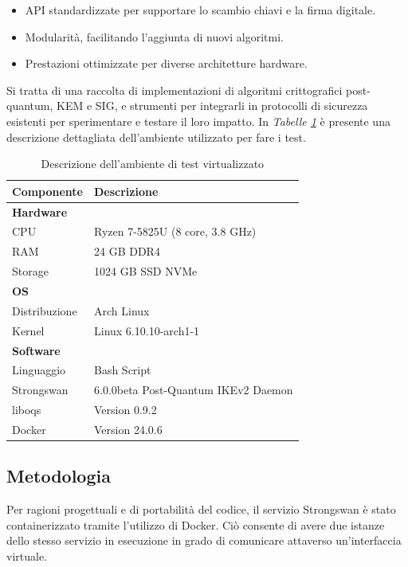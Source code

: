 \begin{itemize}
    \item API standardizzate per supportare lo scambio chiavi e la firma digitale. 
    \item Modularità, facilitando l'aggiunta di nuovi algoritmi. 
    \item Prestazioni ottimizzate per diverse architetture hardware.
\end{itemize}

\noindent
Si tratta di una raccolta di implementazioni di algoritmi crittografici post-quantum, KEM e SIG, e strumenti per integrarli in protocolli di sicurezza esistenti per sperimentare e testare il loro impatto.
In \textit{Tabelle \ref{tab:env}} è presente una descrizione dettagliata dell'ambiente utilizzato per fare i test.

\begin{table}[htbp] 
    \centering 
    \begin{tabular}{p{4cm} p{8cm}} 
        \toprule
        \textbf{Componente} & \textbf{Descrizione} \\ 
        \midrule
        \textbf{Hardware} & \\ 
        CPU & Ryzen 7-5825U (8 core, 3.8 GHz) \\ 
        RAM & 24 GB DDR4 \\ 
        Storage & 1024 GB SSD NVMe \\ 
        \textbf{OS} & \\ 
        Distribuzione & Arch Linux \\
        Kernel & Linux 6.10.10-arch1-1 \\ 
        \textbf{Software} & \\ 
        Linguaggio & Bash Script \\
        Strongswan & 6.0.0beta Post-Quantum IKEv2 Daemon \\
        liboqs & Version 0.9.2 \\
        Docker & Version 24.0.6 \\ 
        \hline 
    \end{tabular} 
    \caption{Descrizione dell'ambiente di test virtualizzato} 
    \label{tab:env}
\end{table}



\subsection{Metodologia}

Per ragioni progettuali e di portabilità del codice, il servizio Strongswan è stato 
containerizzato tramite l'utilizzo di Docker. Ciò consente di avere due istanze dello stesso
servizio in esecuzione in grado di comunicare attaverso un'interfaccia virtuale. 

